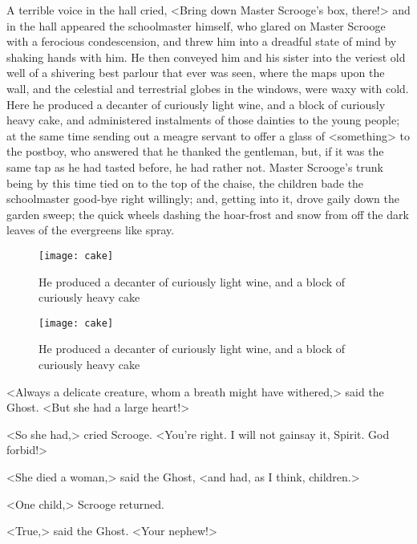 A terrible voice in the hall cried, <Bring down Master Scrooge's box, there!> and in the hall appeared the schoolmaster himself, who glared on Master Scrooge with a ferocious condescension, and threw him into a dreadful state of mind by shaking hands with him. He then conveyed him and his sister into the veriest old well of a shivering best parlour that ever was seen, where the maps upon the wall, and the celestial and terrestrial globes in the windows, were waxy with cold. Here he produced a decanter of curiously light wine, and a block of curiously heavy cake, and administered instalments of those dainties to the young people; at the same time sending out a meagre servant to offer a glass of <something> to the postboy, who answered that he thanked the gentleman, but, if it was the same tap as he had tasted before, he had rather not. Master Scrooge's trunk being by this time tied on to the top of the chaise, the children bade the schoolmaster good-bye right willingly; and, getting into it, drove gaily down the garden sweep; the quick wheels dashing the hoar-frost and snow from off the dark leaves of the evergreens like spray.


\begin{letter}
	\begin{figure}[tbh]
	\centering
	\texttt{[image: cake]}
	\caption[A decanter of curiously light wine]{He produced a decanter of curiously light wine, and a block of curiously heavy cake}
\end{figure}
\end{letter}

\begin{a4}
	\begin{figure}[tbh]
	\centering
	\texttt{[image: cake]}
	\caption[A decanter of curiously light wine]{He produced a decanter of curiously light wine, and a block of curiously heavy cake}
\end{figure}
\end{a4}


<Always a delicate creature, whom a breath might have withered,> said the Ghost. <But she had a large heart!>

<So she had,> cried Scrooge. <You're right. I will not gainsay it, Spirit. God forbid!>

<She died a woman,> said the Ghost, <and had, as I think, children.>

<One child,> Scrooge returned.

<True,> said the Ghost. <Your nephew!>

